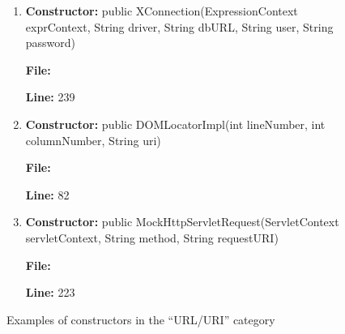 \begin{figure}

\begin{enumerate}

\item
\textbf{Constructor:} public XConnection(ExpressionContext exprContext, String driver, String dbURL, String user, String password)

\textbf{File:} 

\textbf{Line:} 239

\vspace{6px}

\item
\textbf{Constructor:} public DOMLocatorImpl(int lineNumber, int \mbox{columnNumber,} String uri)

\textbf{File:} 

\textbf{Line:} 82

\vspace{6px}

\item
\textbf{Constructor:} public MockHttpServletRequest(ServletContext \mbox{servletContext,} String method, String requestURI)

\textbf{File:} 

\textbf{Line:} 223

%
%
%

\end{enumerate}

\vspace{-12px}

\caption{Examples of constructors in the ``URL/URI'' category}
\label{url}
\end{figure}


